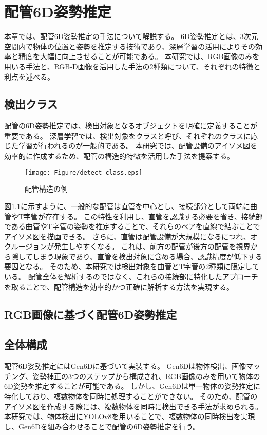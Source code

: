 \chapter{配管6D姿勢推定}
本章では、配管6D姿勢推定の手法について解説する。
6D姿勢推定とは、3次元空間内で物体の位置と姿勢を推定する技術であり、深層学習の活用によりその効率と精度を大幅に向上させることが可能である。
本研究では、RGB画像のみを用いる手法と、RGB-D画像を活用した手法の2種類について、それぞれの特徴と利点を述べる。


\section{検出クラス}
配管の6D姿勢推定では、検出対象となるオブジェクトを明確に定義することが重要である。
深層学習では、検出対象をクラスと呼び、それぞれのクラスに応じた学習が行われるのが一般的である。
本研究では、配管設備のアイソメ図を効率的に作成するため、配管の構造的特徴を活用した手法を提案する。

\begin{figure}[htbt]
	\centering
	 \texttt{[image: Figure/detect\_class.eps]}
	 \caption{配管構造の例}
	 \label{fig:f1}
\end{figure}

図\ref{fig:f1}に示すように、一般的な配管は直管を中心とし、接続部分として両端に曲管やT字管が存在する。
この特性を利用し、直管を認識する必要を省き、接続部である曲管やT字管の姿勢を推定することで、それらのペアを直線で結ぶことでアイソメ図を描画できる。
さらに、直管は配管設備が大規模になるにつれ、オクルージョンが発生しやすくなる。
これは、前方の配管が後方の配管を視界から隠してしまう現象であり、直管を検出対象に含める場合、認識精度が低下する要因となる。
そのため、本研究では検出対象を曲管とT字管の2種類に限定している。
配管全体を解析するのではなく、これらの接続部に特化したアプローチを取ることで、配管構造を効率的かつ正確に解析する方法を実現する。


\section{RGB画像に基づく配管6D姿勢推定}
\section{全体構成}
配管6D姿勢推定にはGen6Dに基づいて実装する。
Gen6Dは物体検出、画像マッチング、姿勢補正の3つのステップから構成され、RGB画像のみを用いて物体の6D姿勢を推定することが可能である。
しかし、Gen6Dは単一物体の姿勢推定に特化しており、複数物体を同時に処理することができない。
そのため、配管のアイソメ図を作成する際には、複数物体を同時に検出できる手法が求められる。
本研究では、物体検出にYOLOv8を用いることで、複数物体の同時検出を実現し、Gen6Dを組み合わせることで配管の6D姿勢推定を行う。

